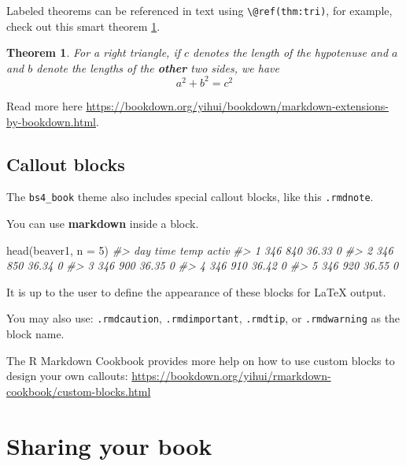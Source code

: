 \documentclass[
]{book}
\newenvironment{Shaded}{\begin{snugshade}}{\end{snugshade}}
\newcommand{\AttributeTok}[1]{\textcolor[rgb]{0.77,0.63,0.00}{#1}}
\newcommand{\CommentTok}[1]{\textcolor[rgb]{0.56,0.35,0.01}{\textit{#1}}}
\newcommand{\DecValTok}[1]{\textcolor[rgb]{0.00,0.00,0.81}{#1}}
\newcommand{\FunctionTok}[1]{\textcolor[rgb]{0.00,0.00,0.00}{#1}}
\newcommand{\NormalTok}[1]{#1}
\newtheorem{theorem}{Theorem}[chapter]
\theoremstyle{definition}
\theoremstyle{definition}
\theoremstyle{definition}
\theoremstyle{definition}
\theoremstyle{remark}
\begin{document}
Labeled theorems can be referenced in text using \texttt{\textbackslash{}@ref(thm:tri)}, for example, check out this smart theorem \ref{thm:tri}.

\begin{theorem}
\protect\hypertarget{thm:tri}{}\label{thm:tri}For a right triangle, if \(c\) denotes the \emph{length} of the hypotenuse
and \(a\) and \(b\) denote the lengths of the \textbf{other} two sides, we have
\[a^2 + b^2 = c^2\]
\end{theorem}

Read more here \url{https://bookdown.org/yihui/bookdown/markdown-extensions-by-bookdown.html}.

\hypertarget{callout-blocks}{%
\section{Callout blocks}\label{callout-blocks}}

The \texttt{bs4\_book} theme also includes special callout blocks, like this \texttt{.rmdnote}.

You can use \textbf{markdown} inside a block.

\begin{Shaded}
\begin{Highlighting}[]
\FunctionTok{head}\NormalTok{(beaver1, }\AttributeTok{n =} \DecValTok{5}\NormalTok{)}
\CommentTok{\#\textgreater{}   day time  temp activ}
\CommentTok{\#\textgreater{} 1 346  840 36.33     0}
\CommentTok{\#\textgreater{} 2 346  850 36.34     0}
\CommentTok{\#\textgreater{} 3 346  900 36.35     0}
\CommentTok{\#\textgreater{} 4 346  910 36.42     0}
\CommentTok{\#\textgreater{} 5 346  920 36.55     0}
\end{Highlighting}
\end{Shaded}

It is up to the user to define the appearance of these blocks for LaTeX output.

You may also use: \texttt{.rmdcaution}, \texttt{.rmdimportant}, \texttt{.rmdtip}, or \texttt{.rmdwarning} as the block name.

The R Markdown Cookbook provides more help on how to use custom blocks to design your own callouts: \url{https://bookdown.org/yihui/rmarkdown-cookbook/custom-blocks.html}

\hypertarget{sharing-your-book}{%
\chapter{Sharing your book}\label{sharing-your-book}}
\end{document}
